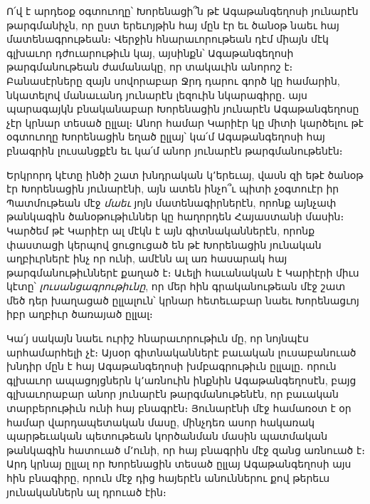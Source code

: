 \documentclass{article}
\begin{document}
{Ո՛վ է արդեօք օգտուողը՝ Խորենացի՞ն թէ Ագաթանգեղոսի յունարէն թարգմանիչն, որ ըստ երեւոյթին հայ մըն էր եւ ծանօթ նաեւ հայ մատենագրութեան։ Վերջին հնարաւորութեան դէմ միայն մէկ գլխաւոր դժուարութիւն կայ, այսինքն՝ Ագաթանգեղոսի թարգմանութեան ժամանակը, որ տակաւին անորոշ է։ Բանասէրները զայն սովորաբար Ջրդ դարու գործ կը համարին, նկատելով մանաւանդ յունարէն լեզուին նկարագիրը․ այս պարագայկն բնականաբար Խորենացին յունարէն Ագաթանգեղոսը չէր կրնար տեսած ըլլալ։ Անոր համար Կարիէր կը միտի կարծելու թէ օգտուողը Խորենացին եղած ըլլայ՝ կա՛մ Ագաթանգեղոսի հայ բնագրին լուսանցքէն եւ կա՛մ անոր յունարէն թարգմանութենէն։

Երկրորդ կէտը ինծի շատ խնդրական կ՚երեւայ, վասն զի եթէ ծանօթ էր Խորենացին յունարէնի, այն ատեն ինչո՞ւ պիտի չօգտուէր իր Պատմութեան մէջ \emph{մաեւ} յոյն մատենագիրներէն, որոնք այնչափ թանկագին ծանօթութիւններ կը հաղորդեն Հայաստանի մասին։ Կարծեմ թէ Կարիէր ալ մէկն է այն գիտնականներէն, որոնք փաստացի կերպով ցուցուցած են թէ Խորենացին յունական աղբիւրներէ ինչ որ ունի, ամէնն ալ առ հասարակ հայ թարգմանութիւններէ քաղած է։ Աւելի հաւանական է Կարիէրի միւս կէտը՝ \emph{լուսանցագրութիւնը}, որ մեր հին գրականութեան մէջ շատ մեծ դեր խաղացած ըլլալուն՝ կրնար հետեւաբար նաեւ Խորենացւոյ իբր աղբիւր ծառայած ըլլալ։

Կա՛յ սակայն նաեւ ուրիշ հնարաւորութիւն մը, որ նոյնպէս արհամարհելի չէ։ Այսօր գիտնականներէ բաւական լուսաբանուած խնդիր մըն է հայ Ագաթանգեղոսի խմբագրութիւն ըլլալը․ որուն գլխաւոր ապացոյցներն կ՚առնուին ինքնին Ագաթանգեղոսէն, բայց գլխաւորաբար անոր յունարէն թարգմանութենէն, որ բաւական տարբերութիւն ունի հայ բնագրէն։ Յունարէնի մէջ համառօտ է օր համար վարդապետական մասը, մինչդեռ ասոր հակառակ պարթեւական պետութեան կործանման մասին պատմական թանկագին հատուած մ՚ունի, որ հայ բնագրին մէջ զանց առնուած է։ Արդ կրնայ ըլլալ որ Խորենացին տեսած ըլլայ Ագաթանգեղոսի այս հին բնագիրը, որուն մէջ դից հայերէն անուններու քով թերեւս յունականներն ալ դրուած էին։

}
\end{document}
